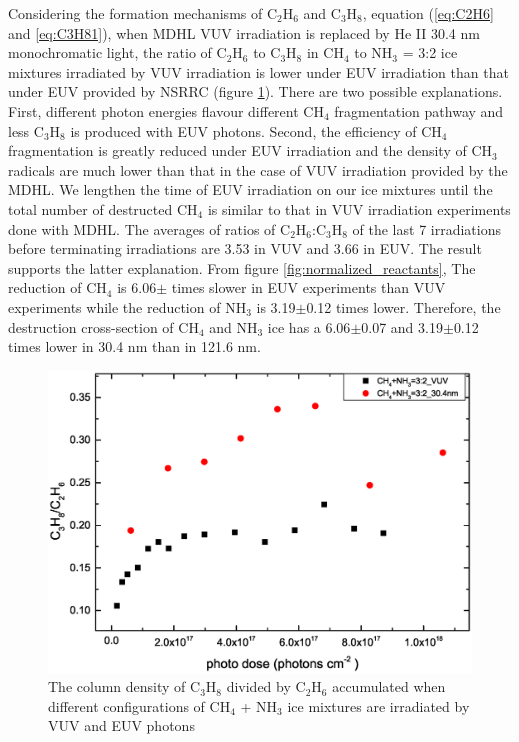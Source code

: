 Considering the formation mechanisms of C$_2$H$_6$ and C$_3$H$_8$, equation (\ref{eq:C2H6} and \ref{eq:C3H81}), when MDHL VUV irradiation is replaced by He II 30.4 nm monochromatic light, the ratio of C$_2$H$_6$ to C$_3$H$_8$ in CH$_4$ to NH$_3$ = 3:2 ice mixtures irradiated by VUV irradiation is lower under EUV irradiation than that  under EUV provided by NSRRC (figure \ref{fig:NSRRC_Lab_C3H8_C2H6}). There are two possible explanations. First, different photon energies flavour different CH$_4$ fragmentation pathway and less C$_3$H$_8$ is produced with EUV photons. Second, the efficiency of CH$_4$ fragmentation is greatly reduced under EUV irradiation and the density of CH$_3$ radicals are much lower than that in the case of VUV irradiation provided by the MDHL. We lengthen the time of EUV irradiation on our ice mixtures until the total number of destructed CH$_4$ is similar to that in VUV irradiation experiments done with MDHL. The averages of ratios of C$_2$H$_6$:C$_3$H$_8$ of the last 7 irradiations before terminating irradiations are 3.53 in VUV and 3.66 in EUV. The result supports the latter explanation. From figure \ref{fig:normalized_reactants}, The reduction of CH$_4$ is 6.06$\pm$ times slower in EUV experiments than VUV experiments while the reduction of NH$_3$ is 3.19$\pm$0.12 times lower. Therefore, the destruction cross-section of CH$_4$ and NH$_3$ ice has a 6.06$\pm$0.07 and 3.19$\pm$0.12 times lower in 30.4 nm than in 121.6 nm.

\begin{figure}
\centering
\includegraphics[width=\textwidth]{figures/chapter3/NSRRC_Lab_C3H8_C2H6.eps}
\caption{The column density of C$_3$H$_8$ divided by C$_2$H$_6$ accumulated when different configurations of CH$_4$ + NH$_3$ ice mixtures are irradiated by VUV and EUV photons}
\label{fig:NSRRC_Lab_C3H8_C2H6}
\end{figure}

